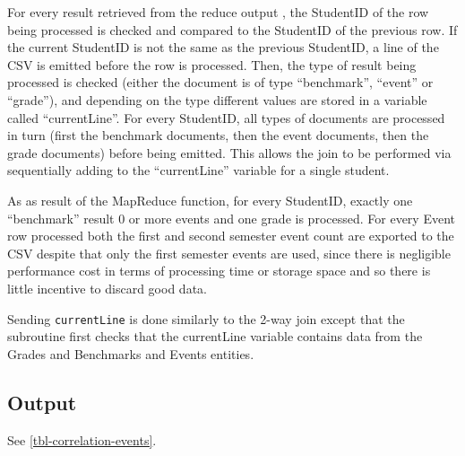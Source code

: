 For every result retrieved from the reduce output , the StudentID of the row being processed is checked and compared to the StudentID of the previous row. If the current StudentID is not the same as the previous StudentID, a line of the CSV is emitted before the row is processed. Then, the type of result being processed is checked (either the document is of type ``benchmark'', ``event'' or ``grade''), and depending on the type different values are stored in a variable called ``currentLine''. For every StudentID, all types of documents are processed in turn (first the benchmark documents, then the event documents, then the grade documents) before being emitted. This allows the join to be performed via sequentially adding to the ``currentLine'' variable for a single student.

As as result of the MapReduce function, for every StudentID, exactly one ``benchmark'' result 0 or more events and one grade is processed. For every Event row processed both the first and second semester event count are exported to the CSV despite that only the first semester events are used, since there is negligible performance cost in terms of processing time or storage space and so there is little incentive to discard good data.

Sending \texttt{currentLine} is done similarly to the 2-way join except that the subroutine first checks that the currentLine variable contains data from the Grades and Benchmarks and Events entities.



\subsection{Output}
See \ref{tbl-correlation-events}.

